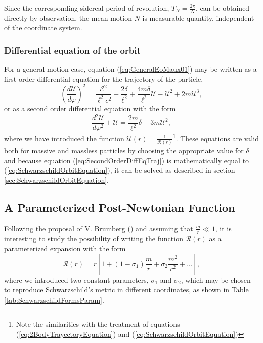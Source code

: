 Since the corresponding sidereal period of revolution, $T_N=\frac{2\pi}{N}$, can be obtained directly by observation, the mean motion $N$ is measurable quantity, independent of the coordinate system.

\subsubsection{Differential equation of the orbit}
 
For a general motion case, equation (\ref{eq:GeneralEoMaux01}) may be written as a first order differential equation for the trajectory of the particle,
\begin{equation}
\left( \frac{d\mathcal{U}}{d\varphi} \right)^2 = \frac{\mathcal{E}^2}{\ell ^2 c^2} - \frac{2\delta}{\ell^2} + \frac{4m\delta}{\ell^2}\mathcal{U} - \mathcal{U}^2 + 2m\mathcal{U}^3,
\end{equation}
or as a second order differential equation with the form
\begin{equation}
\frac{d^2 \mathcal{U}}{d\varphi^2} + \mathcal{U} = \frac{2m}{\ell^2} \delta + 3m\mathcal{U}^2, \label{eq:SecondOrderDiffEqTraj}
\end{equation}
where we have introduced the function $\mathcal{U}(r)=\frac{1}{\mathcal{R}(r)}$\footnote{Note the similarities with the treatment of equations (\ref{eq:2BodyTrayectoryEquation}) and (\ref{eq:SchwarzschildOrbitEquation})}. 
These equations are valid both for massive and massless particles by choosing the appropriate value for $\delta$ and because equation (\ref{eq:SecondOrderDiffEqTraj}) is mathematically equal to (\ref{eq:SchwarzschildOrbitEquation}), it can be solved as described in section \ref{sec:SchwarzschildOrbitEquation}.

\subsection{A Parameterized Post-Newtonian Function}

Following the proposal of V. Brumberg (\citep{Brumberg1991}) and assuming that $\frac{m}{r}\ll 1$, it is interesting to study the possibility of writing the function $\mathcal{R} (r)$ as a parameterized expansion with the form
\begin{equation}
\mathcal{R}(r) = r\left[ 1 + (1-\sigma_1) \frac{m}{r} + \sigma_2 \frac{m^2}{r^2} + ...\right],\label{eq:ParameterizedExpansion}
\end{equation}
where we introduced two constant parameters, $\sigma_1$ and $\sigma_2$, which may be chosen to reproduce Schwarzschild's metric in different coordinates, as shown in Table \ref{tab:SchwarzschildFormsParam}. 


